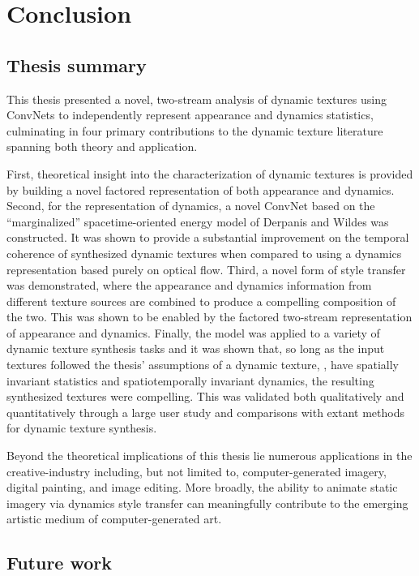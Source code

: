 \chapter{Conclusion}

\section{Thesis summary}\label{sec:thesis_summary}

This thesis presented a novel, two-stream analysis
of dynamic textures using ConvNets to independently represent appearance and
dynamics statistics, culminating in four primary contributions to the dynamic texture literature spanning both theory and application.

First, theoretical insight into the characterization of dynamic textures is provided by building a novel factored representation of both appearance and dynamics. Second, for the representation of dynamics, a novel ConvNet based on the ``marginalized'' spacetime-oriented energy model of Derpanis and Wildes \cite{derpanis2012spacetime} was constructed. It was shown to provide a substantial improvement on the temporal coherence of synthesized dynamic textures when compared to using a dynamics representation based purely on optical flow. Third, a novel form of style transfer was demonstrated, where the appearance and dynamics information from different texture sources are combined to produce a compelling composition of the two. This was shown to be enabled by the factored two-stream representation of appearance and dynamics. Finally, the model was applied to a variety of dynamic texture synthesis tasks and it was shown that, so long as the input textures followed the thesis' assumptions of a dynamic texture, \ie, have spatially invariant statistics and spatiotemporally invariant dynamics, the resulting synthesized textures were compelling. This was validated both qualitatively and quantitatively through a large user study and comparisons with extant methods for dynamic texture synthesis.

Beyond the theoretical implications of this thesis lie numerous applications in the creative-industry including, but not limited to, computer-generated imagery, digital painting, and image editing. More broadly, the ability 
to animate static imagery via dynamics style transfer can meaningfully contribute 
to the emerging artistic medium of computer-generated art.

\section{Future work}\label{sec:future_work}

